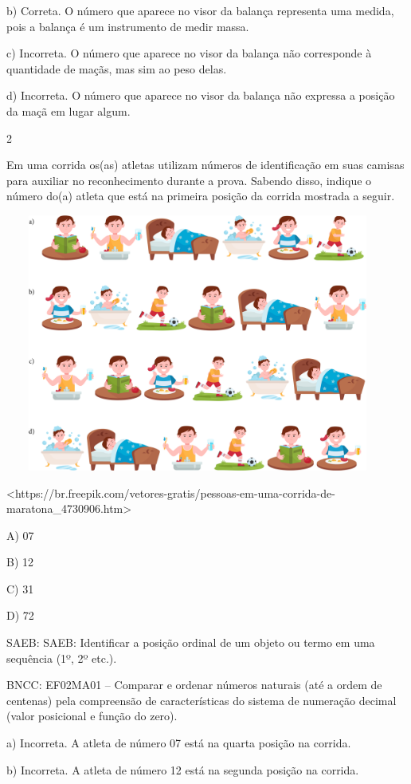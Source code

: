 \begin{escolha}
\begin{escolha}
{{{{b) Correta. O número que aparece no visor da balança representa uma
medida, pois a balança é um instrumento de medir massa.

c) Incorreta. O número que aparece no visor da balança não corresponde à
quantidade de maçãs, mas sim ao peso delas.

d) Incorreta. O número que aparece no visor da balança não expressa a
posição da maçã em lugar algum.

\num{2}

Em uma corrida os(as) atletas utilizam números de identificação em suas
camisas para auxiliar no reconhecimento durante a prova. Sabendo disso,
indique o número do(a) atleta que está na primeira posição da corrida
mostrada a seguir.

\includegraphics[width=5.00000in,height=3.33333in]{media/image142.png}

\textless{}https://br.freepik.com/vetores-gratis/pessoas-em-uma-corrida-de-maratona\_4730906.htm\textgreater{}

A) 07

B) 12

C) 31

D) 72

SAEB: SAEB: Identificar a posição ordinal de um objeto ou termo
em uma sequência (1º, 2º etc.).

BNCC: EF02MA01 -- Comparar e ordenar números naturais (até a ordem de
centenas) pela compreensão de características do sistema de numeração
decimal (valor posicional e função do zero).

a) Incorreta. A atleta de número 07 está na quarta posição na
corrida.

b) Incorreta. A atleta de número 12 está na segunda posição na
corrida.

}}}}
\end{escolha}
\end{escolha}
